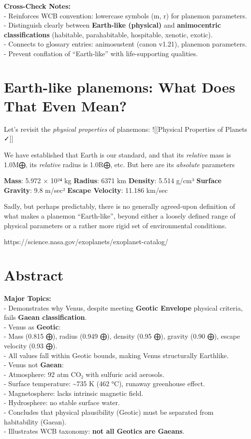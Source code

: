 \documentclass[
  letterpaper,
]{book}
\begin{document}
\textbf{Cross-Check Notes:}\\
- Reinforces WCB convention: lowercase symbols (m, r) for planemon
parameters.\\
- Distinguish clearly between \textbf{Earth-like (physical)} and
\textbf{animocentric classifications} (habitable, parahabitable,
hospitable, xenotic, exotic).\\
- Connects to glossary entries: animosustent (canon v1.21), planemon
parameters.\\
- Prevent conflation of ``Earth-like'' with life-supporting qualities.

\section{Earth-like planemons: What Does That Even
Mean?}\label{earth-like-planemons-what-does-that-even-mean}

Let's revisit the \emph{physical properties} of planemons:
!{[}{[}Physical Properties of Planets ✓{]}{]}

We have established that Earth is our standard, and that its
\emph{relative} mass is 1.0M⨁, its \emph{relative} radius is 1.0R⨁, etc.
But here are its \emph{absolute} parameters

\textbf{Mass}: 5.972 × 10²⁴ kg \textbf{Radius}: 6371 km
\textbf{Density}: 5.514 g/cm³ \textbf{Surface Gravity}: 9.8 m/sec²
\textbf{Escape Velocity}: 11.186 km/sec

Sadly, but perhaps predictably, there is no generally agreed-upon
definition of what makes a planemon ``Earth-like'', beyond either a
loosely defined range of physical parameters or a rather more rigid set
of environmental conditions.

https://science.nasa.gov/exoplanets/exoplanet-catalog/

\section{Abstract}\label{abstract-21}

\textbf{Major Topics:}\\
- Demonstrates why Venus, despite meeting \textbf{Geotic Envelope}
physical criteria, fails \textbf{Gaean classification}.\\
- Venus as \textbf{Geotic}:\\
- Mass (0.815 ⨁), radius (0.949 ⨁), density (0.95 ⨁), gravity (0.90 ⨁),
escape velocity (0.93 ⨁).\\
- All values fall within Geotic bounds, making Venus structurally
Earthlike.\\
- Venus not \textbf{Gaean}:\\
- Atmosphere: 92 atm CO₂ with sulfuric acid aerosols.\\
- Surface temperature: \textasciitilde735 K (462 °C), runaway greenhouse
effect.\\
- Magnetosphere: lacks intrinsic magnetic field.\\
- Hydrosphere: no stable surface water.\\
- Concludes that physical plausibility (Geotic) must be separated from
habitability (Gaean).\\
- Illustrates WCB taxonomy: \textbf{not all Geotics are Gaeans}.
\end{document}
